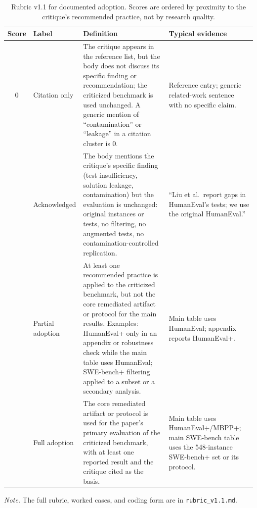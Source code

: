 \documentclass[11pt,a4paper]{article}
\begin{document}
\begin{table}[t]
\centering
\caption{Rubric v1.1 for documented adoption. Scores are ordered by proximity to the critique's recommended practice, not by research quality.}
\label{tab:rubric}
\footnotesize
\begin{threeparttable}
\begin{tabularx}{\textwidth}{@{}c l X X@{}}
\toprule
Score & Label & Definition & Typical evidence \\
\midrule
0 & Citation only & The critique appears in the reference list, but the body does not discuss its specific finding or recommendation; the criticized benchmark is used unchanged. A generic mention of ``contamination'' or ``leakage'' in a citation cluster is 0. & Reference entry; generic related-work sentence with no specific claim. \\
\addlinespace
1 & Acknowledged & The body mentions the critique's specific finding (test insufficiency, solution leakage, contamination) but the evaluation is unchanged: original instances or tests, no filtering, no augmented tests, no contamination-controlled replication. & ``Liu et al.\ report gaps in HumanEval's tests; we use the original HumanEval.'' \\
\addlinespace
2 & Partial adoption & At least one recommended practice is applied to the criticized benchmark, but not the core remediated artifact or protocol for the main results. Examples: HumanEval+ only in an appendix or robustness check while the main table uses HumanEval; SWE-bench+ filtering applied to a subset or a secondary analysis. & Main table uses HumanEval; appendix reports HumanEval+. \\
\addlinespace
3 & Full adoption & The core remediated artifact or protocol is used for the paper's primary evaluation of the criticized benchmark, with at least one reported result and the critique cited as the basis. & Main table uses HumanEval+/MBPP+; main SWE-bench table uses the 548-instance SWE-bench+ set or its protocol. \\
\bottomrule
\end{tabularx}
\begin{tablenotes}[flushleft]\footnotesize
\item \textit{Note.} The full rubric, worked cases, and coding form are in \texttt{rubric\_v1.1.md}.
\end{tablenotes}
\end{threeparttable}
\end{table}
\end{document}
